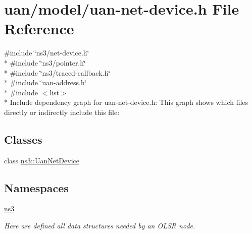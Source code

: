 \hypertarget{uan-net-device_8h}{}\section{uan/model/uan-\/net-\/device.h File Reference}
\label{uan-net-device_8h}
{\ttfamily \#include \char`\"{}ns3/net-\/device.\+h\char`\"{}}\\*
{\ttfamily \#include \char`\"{}ns3/pointer.\+h\char`\"{}}\\*
{\ttfamily \#include \char`\"{}ns3/traced-\/callback.\+h\char`\"{}}\\*
{\ttfamily \#include \char`\"{}uan-\/address.\+h\char`\"{}}\\*
{\ttfamily \#include $<$list$>$}\\*
Include dependency graph for uan-\/net-\/device.h\+:
This graph shows which files directly or indirectly include this file\+:
\subsection*{Classes}
\begin{DoxyCompactItemize}
\item 
class \hyperlink{classns3_1_1UanNetDevice}{ns3\+::\+Uan\+Net\+Device}
\end{DoxyCompactItemize}
\subsection*{Namespaces}
\begin{DoxyCompactItemize}
\item 
 \hyperlink{namespacens3}{ns3}
\begin{DoxyCompactList}\small\item\em Here are defined all data structures needed by an O\+L\+SR node. \end{DoxyCompactList}\end{DoxyCompactItemize}

